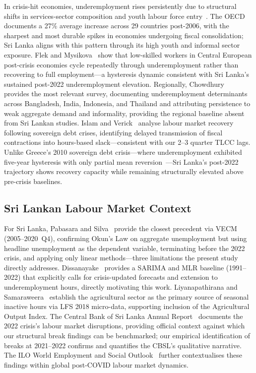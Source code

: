 \documentclass[sigconf]{acmart}
\begin{document}
In crisis-hit economies, underemployment rises persistently due to
structural shifts in services-sector composition and youth labour
force entry~\cite{oecd2017}. The OECD~\cite{oecd2017} documents a 27\%
average increase across 29 countries post-2006, with the sharpest and
most durable spikes in economies undergoing fiscal consolidation;
Sri Lanka aligns with this pattern through its high youth and informal
sector exposure. Flek and Mysikova~\cite{flek2015} show that low-skilled
workers in Central European post-crisis economies cycle repeatedly
through underemployment rather than recovering to full employment---a
hysteresis dynamic consistent with Sri Lanka's sustained post-2022
underemployment elevation. Regionally, Chowdhury~\cite{chowdhury2009}
provides the most relevant survey, documenting underemployment
determinants across Bangladesh, India, Indonesia, and Thailand and
attributing persistence to weak aggregate demand and informality,
providing the regional baseline absent from Sri Lankan studies.
Islam and Verick~\cite{islam2011} analyse labour market recovery following
sovereign debt crises, identifying delayed transmission of fiscal
contractions into hours-based slack---consistent with our 2--3 quarter
TLCC lags. Unlike Greece's 2010 sovereign debt crisis---where
underemployment exhibited five-year hysteresis with only partial
mean reversion~\cite{oecd2017}---Sri Lanka's post-2022 trajectory shows
recovery capacity while remaining structurally elevated above pre-crisis
baselines.

\subsection{Sri Lankan Labour Market Context}

For Sri Lanka, Pabasara and Silva~\cite{pabasara2025impact} provide the closest precedent
via VECM (2005--2020~Q4), confirming Okun's Law on aggregate
unemployment but using headline unemployment as the dependent
variable, terminating before the 2022 crisis, and applying only linear
methods---three limitations the present study directly addresses.
Dissanayake~\cite{dissanayake2026} provides a SARIMA and MLR baseline
(1991--2022) that explicitly calls for crisis-updated forecasts and extension
to underemployment hours, directly motivating this work.
Liyanapathirana and Samaraweera~\cite{perera2022} establish the
agricultural sector as the primary source of seasonal inactive hours via
LFS 2018 micro-data, supporting inclusion of the Agricultural Output Index.
The Central Bank of Sri Lanka Annual Report~\cite{cbsl2025} documents the
2022 crisis's labour market disruptions, providing official context against
which our structural break findings can be benchmarked; our empirical
identification of breaks at 2021--2022 confirms and quantifies the CBSL's
qualitative narrative. The ILO World Employment and Social
Outlook~\cite{iloweso2024} further contextualises these findings within
global post-COVID labour market dynamics.
\end{document}

